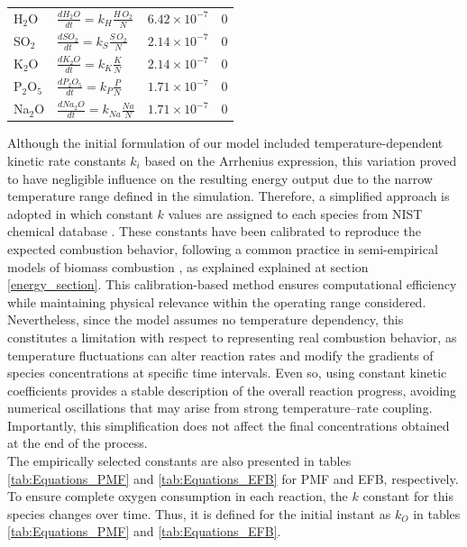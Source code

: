 \documentclass[preprint,12pt]{elsarticle}
\begin{document}
\begin{table}[H]
\begin{tabularx}{\textwidth}{l >{\centering\arraybackslash}X c c}
H$_2$O &
$\displaystyle \frac{dH_2O}{dt} = k_H \frac{H\,O_2}{N}$ &
$6.42 \times 10^{-7}$ & 
0 \\[4pt]

SO$_2$ &
$\displaystyle \frac{dSO_2}{dt} = k_S \frac{S\,O_2}{N}$ &
$2.14 \times 10^{-7}$ & 
0 \\[4pt]

K$_2$O & 
$\displaystyle \frac{dK_2O}{dt} = k_K \frac{K}{N}$ &
$2.14 \times 10^{-7}$ & 
0 \\[4pt]

P$_2$O$_5$ & 
$\displaystyle \frac{dP_2O_5}{dt} = k_P \frac{P}{N}$ &
$1.71 \times 10^{-7}$ & 
0 \\[4pt]

Na$_2$O & 
$\displaystyle \frac{dNa_2O}{dt} = k_{Na} \frac{Na}{N}$ &
$1.71 \times 10^{-7}$ & 
0 \\[6pt]
\hline
\end{tabularx}
\end{table}


Although the initial formulation of our model included temperature-dependent kinetic rate constants $k_i$ based on the Arrhenius expression, this variation proved to have negligible influence on the resulting energy output due to the narrow temperature range defined in the simulation. Therefore, a simplified approach is adopted in which constant $k$ values are assigned to each species from NIST chemical database \cite{NISTkinetics}.  These constants have been calibrated to reproduce the expected combustion behavior, following a common practice in semi-empirical models of biomass combustion \cite{GarciaNunez2006}, as explained explained at section \ref{energy_section}.  This calibration-based method ensures computational efficiency while maintaining physical relevance within the operating range considered. Nevertheless, since the model assumes no temperature dependency, this constitutes a limitation with respect to representing real combustion behavior, as temperature fluctuations can alter reaction rates and modify the gradients of species concentrations at specific time intervals. Even so, using constant kinetic coefficients provides a stable description of the overall reaction progress, avoiding numerical oscillations that may arise from strong temperature–rate coupling. Importantly, this simplification does not affect the final concentrations obtained at the end of the process. \\

The empirically selected constants are also presented in tables \ref{tab:Equations_PMF} and \ref{tab:Equations_EFB} for PMF and EFB, respectively. To ensure complete oxygen consumption in each reaction, the $k$ constant for this species changes over time. Thus, it is defined for the initial instant as $k_O$ in tables \ref{tab:Equations_PMF} and \ref{tab:Equations_EFB}.  \\ 
\end{document}
